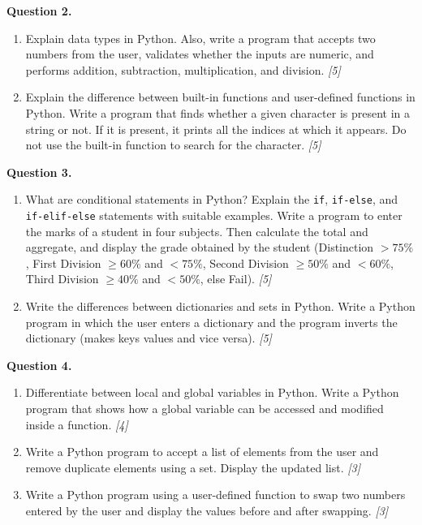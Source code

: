 \documentclass[11pt,a4paper]{article}
\newcommand{\pts}[1]{\hfill \textit{[#1]}}
\begin{document}
\bigskip

\noindent \textbf{Question 2.}
\begin{enumerate}[label=(\alph*)]
  \item Explain data types in Python. Also, write a program that accepts two numbers from the user, validates whether the inputs are numeric, and performs addition, subtraction, multiplication, and division. \pts{5}
  \item Explain the difference between built-in functions and user-defined functions in Python. Write a program that finds whether a given character is present in a string or not. If it is present, it prints all the indices at which it appears. Do not use the built-in function to search for the character. \pts{5}
\end{enumerate}

\bigskip

\noindent \textbf{Question 3.}
\begin{enumerate}[label=(\alph*)]
  \item What are conditional statements in Python? Explain the \texttt{if}, \texttt{if-else}, and \texttt{if-elif-else} statements with suitable examples. Write a program to enter the marks of a student in four subjects. Then calculate the total and aggregate, and display the grade obtained by the student (Distinction $>75\%$, First Division $\ge 60\%$ and $<75\%$, Second Division $\ge 50\%$ and $<60\%$, Third Division $\ge 40\%$ and $<50\%$, else Fail). \pts{5}
  \item Write the differences between dictionaries and sets in Python. Write a Python program in which the user enters a dictionary and the program inverts the dictionary (makes keys values and vice versa). \pts{5}
\end{enumerate}

\bigskip

\noindent \textbf{Question 4.}
\begin{enumerate}[label=(\alph*)]
  \item Differentiate between local and global variables in Python. Write a Python program that shows how a global variable can be accessed and modified inside a function. \pts{4}
  \item Write a Python program to accept a list of elements from the user and remove duplicate elements using a set. Display the updated list. \pts{3}
  \item Write a Python program using a user-defined function to swap two numbers entered by the user and display the values before and after swapping. \pts{3}
\end{enumerate}
\end{document}

